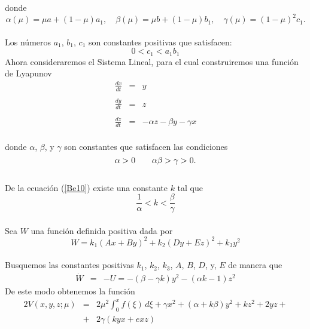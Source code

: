 \documentclass[letter]{article}
\begin{document}
donde
\begin{equation}\label{Be4}
\alpha(\mu)=\mu a+(1-\mu)a_1,\quad\beta(\mu)=\mu
b+(1-\mu)b_1,\quad\gamma(\mu)=(1-\mu)^2c_1.
\end{equation}
\\
Los n{\'u}meros $a_1$, $b_1$, $c_1$ son constantes positivas que
satisfacen:
\begin{equation}\label{Be5}
0<c_1<a_1 b_1
\end{equation}
Ahora consideraremos el Sistema Lineal, para el cual construiremos
una funci{\'o}n de Lyapunov
\begin{equation}\label{Be7}
\begin{array}{lcl}
\displaystyle{\frac{dx}{dt}}&=&y\\&&\\
\displaystyle{\frac{dy}{dt}}&=&z\\&&\\\displaystyle{\frac{dz}{dt}}&=&-\alpha
z-\beta y-\gamma  x
\end{array}
\end{equation}
\\
donde $\alpha$, $\beta$, y $\gamma $ son  constantes que
satisfacen las condiciones
\begin{equation}\label{Be10}
\alpha>0\hspace{0.7cm}\alpha\beta>\gamma>0.
\end{equation}
\\
De la ecuaci{\'o}n (\ref{Be10}) existe una constante $k$ tal que
\begin{equation}\label{Be11}
\displaystyle{\frac{1}{\alpha}}<k<\displaystyle{\frac{\beta}{\gamma}}
\end{equation}
\\
Sea $W$ una funci{\'o}n definida positiva dada por
\\
$$W=k_1(A x+B y)^2+k_2(D y+E z)^2+k_3 y^2 $$
\\
Busquemos las constantes positivas $k_1$, $ k_2$, $ k_3$, $A$,
$B$, $D$, y, $E$ de manera que
\begin{equation}\label{Be13}
\begin{array}{lcl}
\dot{W}&=&-U=-(\beta-\gamma k)y^2-(\alpha k-1)z^2
\end{array}
\end{equation}
De este modo obtenemos la funci{\'o}n
\begin{equation}\label{Be15}
\begin{array}{lcl}
2V(x,y,z;\mu)&=&2\mu^2\int_0^xf(\xi)\,d\xi+\gamma x^2+(\alpha +k
\beta )y^2+k z^2+2yz+\\&+&2\gamma( k yx+exz)
\end{array}
\end{equation}
\end{document}
